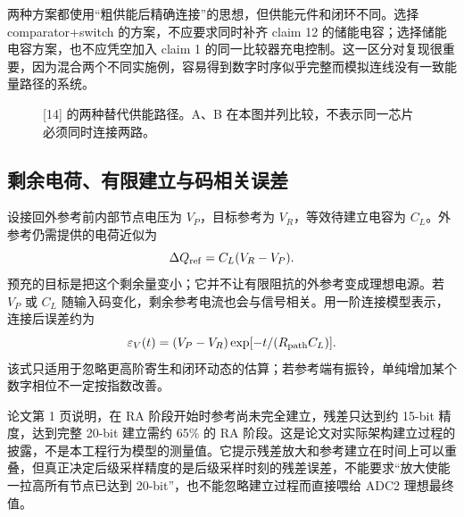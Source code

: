 两种方案都使用“粗供能后精确连接”的思想，但供能元件和闭环不同。选择 comparator+switch 的方案，不应要求同时补齐 claim 12 的储能电容；选择储能电容方案，也不应凭空加入 claim 1 的同一比较器充电控制。这一区分对复现很重要，因为混合两个不同实施例，容易得到数字时序似乎完整而模拟连线没有一致能量路径的系统。

\begin{figure}[htbp]\centering
{}
\caption{[14] 的两种替代供能路径。A、B 在本图并列比较，不表示同一芯片必须同时连接两路。}
\end{figure}

\subsection{剩余电荷、有限建立与码相关误差}
设接回外参考前内部节点电压为 \(V_P\)，目标参考为 \(V_R\)，等效待建立电容为 \(C_L\)。外参考仍需提供的电荷近似为
\begin{equation}
\Delta Q_{\rm ref}=C_L(V_R-V_P).
\end{equation}
预充的目标是把这个剩余量变小；它并不让有限阻抗的外参考变成理想电源。若 \(V_P\) 或 \(C_L\) 随输入码变化，剩余参考电流也会与信号相关。用一阶连接模型表示，连接后误差约为
\begin{equation}
\varepsilon_V(t)=(V_P-V_R)\exp[-t/(R_{\rm path}C_L)].
\end{equation}
该式只适用于忽略更高阶寄生和闭环动态的估算；若参考端有振铃，单纯增加某个数字相位不一定按指数改善。

论文第 1 页说明，在 RA 阶段开始时参考尚未完全建立，残差只达到约 15-bit 精度，达到完整 20-bit 建立需约 65\% 的 RA 阶段。这是论文对实际架构建立过程的披露，不是本工程行为模型的测量值。它提示残差放大和参考建立在时间上可以重叠，但真正决定后级采样精度的是后级采样时刻的残差误差，不能要求“放大使能一拉高所有节点已达到 20-bit”，也不能忽略建立过程而直接喂给 ADC2 理想最终值。

